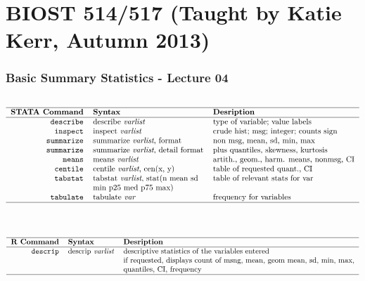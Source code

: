 \documentclass[11pt,letterpaper,fleqn]{report}
\begin{document}
\section{BIOST 514/517 (Taught by Katie Kerr, Autumn 2013)}
\subsubsection{Basic Summary Statistics - Lecture 04}
$$\begin{tabular}{rll}
\multicolumn{3}{l}{}\\ \hline
\textbf{STATA Command} & \textbf{Syntax} & \textbf{Desription}\\ \hline
\texttt{describe} & describe \textit{varlist} & type of variable; value labels \\
\texttt{inspect} & inspect \textit{varlist} & crude hist; msg; integer; counts sign \\
\texttt{summarize} & summarize \textit{varlist}, format & non msg, mean, sd, min, max \\
\texttt{summarize} & summarize \textit{varlist}, detail format & plus quantiles, skewness, kurtosis \\
\texttt{means} & means \textit{varlist} & artith., geom., harm. means, nonmsg, CI \\
\texttt{centile} & centile \textit{varlist}, cen(x, y) & table of requested quant., CI \\
\texttt{tabstat} & tabstat \textit{varlist}, stat(n mean sd & table of relevant stats for var \\
~ & min p25 med p75 max) & \\
\texttt{tabulate} & tabulate \textit{var} & frequency for variables \\
\hline
\end{tabular}$$\\
$$\begin{tabular}{rll}
\multicolumn{3}{l}{}\\ \hline
\textbf{R Command} & \textbf{Syntax} & \textbf{Desription}\\ \hline
\texttt{descrip} & descrip \textit{varlist} & descriptive statistics of the variables entered \\
 & & if requested, displays count of msng, mean, geom mean, sd, min, max, \\
  & & quantiles, CI, frequency\\ 
\hline
\end{tabular}$$\\
\end{document}
